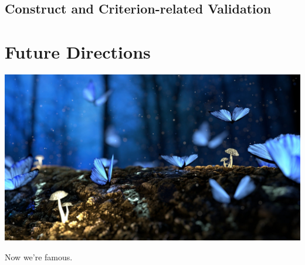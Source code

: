 \documentclass[
]{book}
\begin{document}
\hypertarget{construct-and-criterion-related-validation}{%
\section{Construct and Criterion-related Validation}\label{construct-and-criterion-related-validation}}

\hypertarget{future-directions}{%
\chapter{Future Directions}\label{future-directions}}

\includegraphics{fantasy-g653fba516_1920.jpg}

Now we're famous.

  
\end{document}
